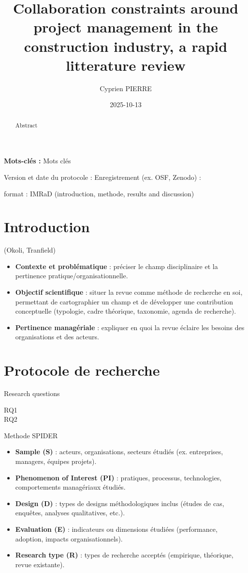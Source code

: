 \documentclass[a4paper,12pt]{article}
\author{Cyprien PIERRE \orcidlink{0009-0009-9040-6795}}
\date{2025-10-13}
\title{Collaboration constraints around project management in the construction industry, a rapid litterature review}
\newenvironment{keyword}{\begin{trivlist}\item[]{\bfseries Mots-clés :}}{\end{trivlist}}
\begin{document}
\maketitle
\begin{abstract}
Abstract
\end{abstract}

\begin{keyword}
Mots clés
\end{keyword}

Version et date du protocole : 
Enregistrement (ex. OSF, Zenodo) : 

format : IMRaD (introduction, methode, results and discussion)
\section{Introduction}
\label{sec:orgbc71fbd}
(Okoli, Tranfield)
\begin{itemize}
\item \textbf{\textbf{Contexte et problématique}} : préciser le champ disciplinaire et la pertinence pratique/organisationnelle.
\item \textbf{\textbf{Objectif scientifique}} : situer la revue comme méthode de recherche en soi, permettant de cartographier un champ et de développer une contribution conceptuelle (typologie, cadre théorique, taxonomie, agenda de recherche).
\item \textbf{\textbf{Pertinence managériale}} : expliquer en quoi la revue éclaire les besoins des organisations et des acteurs.
\end{itemize}
\section{Protocole de recherche}
\label{sec:org1f5cb31}
Research questions
\begin{description}
\item[{RQ1}] 

\item[{RQ2}] 
\end{description}

Methode SPIDER
\begin{itemize}
\item \textbf{\textbf{Sample (S)}} : acteurs, organisations, secteurs étudiés (ex. entreprises, managers, équipes projets).
\item \textbf{\textbf{Phenomenon of Interest (PI)}} : pratiques, processus, technologies, comportements managériaux étudiés.
\item \textbf{\textbf{Design (D)}} : types de designs méthodologiques inclus (études de cas, enquêtes, analyses qualitatives, etc.).
\item \textbf{\textbf{Evaluation (E)}} : indicateurs ou dimensions étudiées (performance, adoption, impacts organisationnels).
\item \textbf{\textbf{Research type (R)}} : types de recherche acceptés (empirique, théorique, revue existante).
\end{itemize}
\end{document}
